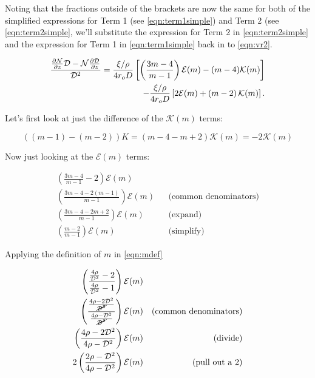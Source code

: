 Noting that the fractions outside of the brackets are now the same for both of the simplified expressions for Term 1 (see \cref{eqn:term1simple}) and Term 2 (see \cref{eqn:term2simple}, we'll substitute the expression for Term 2 in \cref{eqn:term2simple} and the expression for Term 1 in \cref{eqn:term1simple} back in to \cref{eqn:vr2}.
%

\begin{equation}
    \begin{split}
\frac{\frac{\partial \mathcal{N}}{\partial z}\mathcal{D} - \mathcal{N}\frac{\partial \mathcal{D}}{\partial z}}{\mathcal{D}^2} = \frac{\xi/\rho}{4 r_o D} \left[ \left(\frac{3m-4}{m-1} \right)\mathcal{E}(m) - (m-4)\mathcal{K}(m) \right] \\
        - \frac{\xi/\rho }{4 r_o D} \left[ 2\mathcal{E}(m) + \left(m - 2 \right)\mathcal{K}(m) \right].
    \end{split}
\end{equation}

\noindent Let's first look at just the difference of the \(\mathcal{K}(m)\) terms:

\begin{equation}
    \label{eqn:kterms}
    ((m-1) - (m-2))K = (m - 4 - m + 2)\mathcal{K}(m) = -2\mathcal{K}(m)
\end{equation}

\noindent Now just looking at the \(\mathcal{E}(m)\) terms:

\begin{equation}
    \label{eqn:eterms}
    \begin{aligned}
        \left(\frac{3m-4}{m-1} - 2\right)\mathcal{E}(m) \\
        \left(\frac{3m-4-2(m-1)}{m-1} \right)\mathcal{E}(m) && \text{(common denominators)} \\
        \left(\frac{3m-4-2m+2}{m-1} \right)\mathcal{E}(m) && \text{(expand)} \\
        \left(\frac{m-2}{m-1} \right)\mathcal{E}(m) && \text{(simplify)}
    \end{aligned}
\end{equation}

\noindent Applying the definition of \(m\) in \cref{eqn:mdef}

\begin{equation}
    \label{eqn:eterms2}
    \begin{aligned}
        \left(\frac{\frac{4\rho}{\mathcal{D}^2}-2}{\frac{4\rho}{\mathcal{D}^2}-1} \right)\mathcal{E}(m) \\
        \left(\frac{\frac{4\rho-2\mathcal{D}^2}{\cancel{\mathcal{D}^2}}}{\frac{4\rho-\mathcal{D}^2}{\cancel{\mathcal{D}^2}}} \right)\mathcal{E}(m) && \text{(common denominators)}\\
        \left(\frac{4\rho-2\mathcal{D}^2}{4\rho-\mathcal{D}^2} \right)\mathcal{E}(m) && \text{(divide)} \\
        2\left(\frac{2\rho-\mathcal{D}^2}{4\rho-\mathcal{D}^2} \right)\mathcal{E}(m) && \text{(pull out a 2)}
    \end{aligned}
\end{equation}


